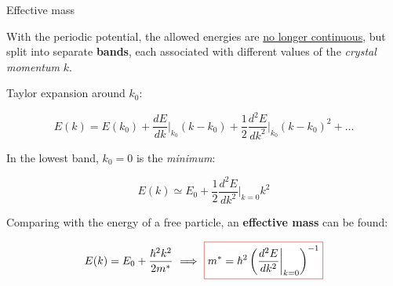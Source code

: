 \begin{frame}{Effective mass}
    \small

    With the periodic potential, the allowed energies are \underline{no longer continuous}, but split into separate \textbf{bands}, each associated with different values of the \textit{crystal momentum} $k$.

    \vfill

    \pause

    \footnotesize

    Taylor expansion around $k_0$:

    \begin{equation*}
        E(k)=E\left(k_0\right)+\frac{dE}{dk}\bigg|_{k_0}\left(k-k_0\right)+\frac{1}{2}\frac{d^2E}{dk^2}\bigg|_{k_0}\left(k-k_0\right)^2+\dots
    \end{equation*}

    \pause

    In the lowest band, $k_0=0$ is the \textit{minimum}:

    \begin{equation*}
        E(k)\simeq E_0+\frac{1}{2}\frac{d^2E}{dk^2}\bigg|_{k=0}k^2
    \end{equation*}

    \pause

    Comparing with the energy of a free particle, an \textcolor{BrickRed}{\textbf{effective mass}} can be found:

    \begin{equation*}
        E(k)=E_0+\frac{\hbar^2k^2}{2m^*} \ \Longrightarrow \ \fcolorbox{BrickRed}{white}{\text{$\displaystyle m^*=\hbar^2\left(\frac{d^2E}{dk^2}\bigg|_{k=0}\right)^{-1}$}}
    \end{equation*}

    \normalsize
\end{frame}

